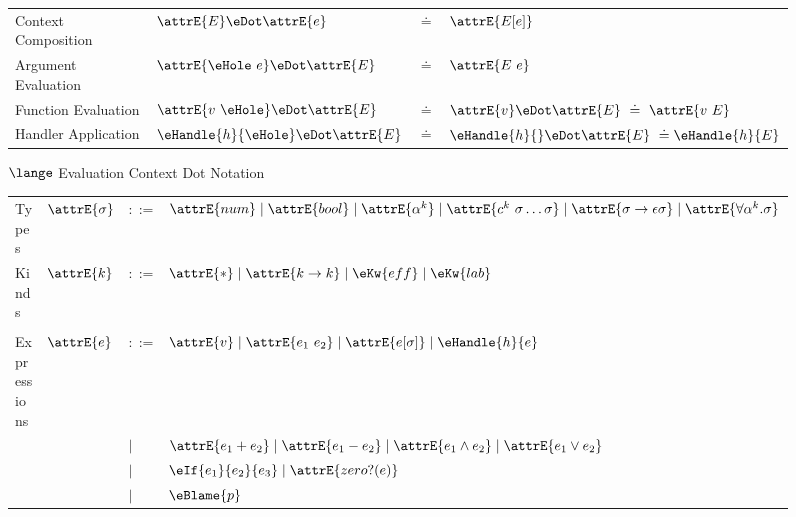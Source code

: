 \begin{singlespace}

\begin{figure}[h]
  \centering
  \begin{tabular}{llll}
    Context Composition & $\attrE{E} \eDot \attrE{e}$ & $\doteq$ & $\attrE{E[e]}$ \\
    Argument Evaluation & $\attrE{\eHole \ e} \eDot \attrE{E}$ & $\doteq$ & $\attrE{E \ e}$ \\
    Function Evaluation & $\attrE{v \ \eHole} \eDot \attrE{E}$ & $\doteq$ & $\attrE{v} \eDot \attrE{E} \ \doteq \ \attrE{v \ E}$ \\
    Handler Application & $\eHandle{h}{\eHole} \eDot \attrE{E}$ & $\doteq$ & $\eHandle{h}{} \eDot \attrE{E} \ \doteq \eHandle{h}{E}$
  \end{tabular}
  \caption{$\lange$ Evaluation Context Dot Notation}
  \label{fig:lange-dot}
\end{figure}

\begin{figure}[h]
  \centering
  \begin{tabular}{llll}
    Types       & $\attrE{\sigma}$ & $::=$ & $\attrE{num} \mid \attrE{bool} \mid \attrE{\alpha^k} \mid \attrE{c^k \ \sigma \dots \sigma} \mid \attrE{\sigma \to \epsilon\sigma} \mid \attrE{\forall \alpha^k. \sigma}$ \\
    Kinds       & $\attrE{k}$      & $::=$ & $\attrE{*} \mid \attrE{k \to k} \mid \eKw{eff} \mid \eKw{lab}$ \\
    \\
    Expressions & $\attrE{e}$      & $::=$ & $\attrE{v} \mid \attrE{e_1 \ e_2} \mid \attrE{e[\sigma]} \mid \eHandle{h}{e}$ \\
    & & $\mid$ & $\attrE{e_1 + e_2} \mid \attrE{e_1 - e_2} \mid \attrE{e_1 \wedge e_2} \mid \attrE{e_1 \vee e_2}$ \\
    & & $\mid$ & $\eIf{e_1}{e_2}{e_3} \mid \attrE{zero?(e)}$ \\
    & & $\mid$ & $\eBlame{p}$\\


\end{tabular}
\end{figure}
\end{singlespace}
